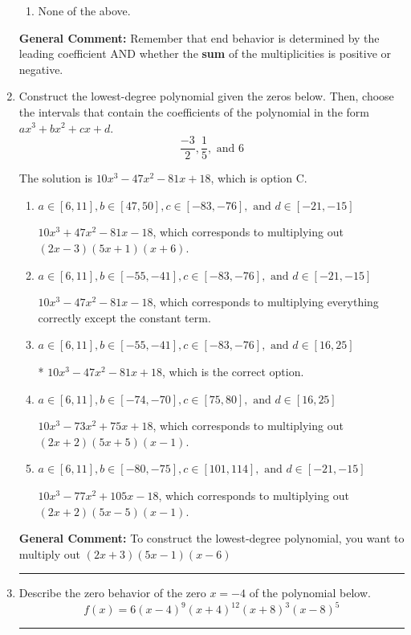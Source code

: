 \documentclass{extbook}[14pt]
\newcommand{\litem}[1]{\item #1

\rule{\textwidth}{0.4pt}}
\begin{document}
\begin{enumerate}
{\begin{enumerate}[label=\Alph*.]
\begin{multicols}{2}
\end{multicols}\item None of the above.\end{enumerate}
\textbf{General Comment:} Remember that end behavior is determined by the leading coefficient AND whether the \textbf{sum} of the multiplicities is positive or negative.
}
\litem{
Construct the lowest-degree polynomial given the zeros below. Then, choose the intervals that contain the coefficients of the polynomial in the form $ax^3+bx^2+cx+d$.
\[ \frac{-3}{2}, \frac{1}{5}, \text{ and } 6 \]

The solution is \( 10x^{3} -47 x^{2} -81 x + 18 \), which is option C.\begin{enumerate}[label=\Alph*.]
\item \( a \in [6, 11], b \in [47, 50], c \in [-83, -76], \text{ and } d \in [-21, -15] \)

$10x^{3} +47 x^{2} -81 x -18$, which corresponds to multiplying out $(2x -3)(5x + 1)(x + 6)$.
\item \( a \in [6, 11], b \in [-55, -41], c \in [-83, -76], \text{ and } d \in [-21, -15] \)

$10x^{3} -47 x^{2} -81 x -18$, which corresponds to multiplying everything correctly except the constant term.
\item \( a \in [6, 11], b \in [-55, -41], c \in [-83, -76], \text{ and } d \in [16, 25] \)

* $10x^{3} -47 x^{2} -81 x + 18$, which is the correct option.
\item \( a \in [6, 11], b \in [-74, -70], c \in [75, 80], \text{ and } d \in [16, 25] \)

$10x^{3} -73 x^{2} +75 x + 18$, which corresponds to multiplying out $(2x + 2)(5x + 5)(x -1)$.
\item \( a \in [6, 11], b \in [-80, -75], c \in [101, 114], \text{ and } d \in [-21, -15] \)

$10x^{3} -77 x^{2} +105 x -18$, which corresponds to multiplying out $(2x + 2)(5x -5)(x -1)$.
\end{enumerate}

\textbf{General Comment:} To construct the lowest-degree polynomial, you want to multiply out $(2x + 3)(5x -1)(x -6)$
}
\litem{
Describe the zero behavior of the zero $x = -4$ of the polynomial below.
\[ f(x) = 6(x - 4)^{9}(x + 4)^{12}(x + 8)^{3}(x - 8)^{5} \]

}
\end{enumerate}
\end{document}
